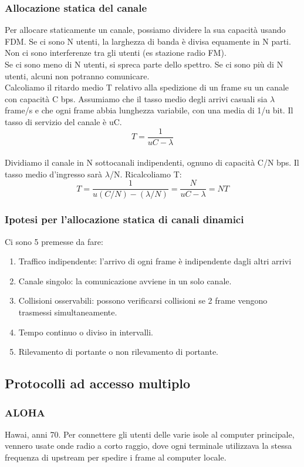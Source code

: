 \documentclass{article}
\begin{document}
\subsubsection{Allocazione statica del canale}
Per allocare staticamente un canale, possiamo dividere la sua capacità usando FDM. Se ci sono N utenti, la larghezza di banda è divisa equamente in N parti. Non ci sono interferenze tra gli utenti (es stazione radio FM). \\
Se ci sono meno di N utenti, si spreca parte dello spettro. Se ci sono più di N utenti, alcuni non potranno comunicare. \\
Calcoliamo il ritardo medio T relativo alla spedizione di un frame su un canale con capacità C bps. Assumiamo che il tasso medio degli arrivi casuali sia $\lambda$ frame/s e che ogni frame abbia lunghezza variabile, con una media di 1/u bit. Il tasso di servizio del canale è uC.
\begin{equation}
	T = \frac{1}{uC - \lambda}
\end{equation} 
\\
Dividiamo il canale in N sottocanali indipendenti, ognuno di capacità C/N bps. Il tasso medio d'ingresso sarà $\lambda$/N. Ricalcoliamo T:
\begin{equation}
	T = \frac{1}{u(C/N) - (\lambda /N)} = \frac{N}{uC - \lambda} = NT
\end{equation} 
\subsubsection{Ipotesi per l'allocazione statica di canali dinamici}
Ci sono 5 premesse da fare:
\begin{enumerate}
\item Traffico indipendente: l'arrivo di ogni frame è indipendente dagli altri arrivi
\item Canale singolo: la comunicazione avviene in un solo canale.
\item Collisioni osservabili: possono verificarsi collisioni se 2 frame vengono trasmessi simultaneamente.
\item Tempo continuo o diviso in intervalli.
\item Rilevamento di portante o non rilevamento di portante.
\end{enumerate}
\subsection{Protocolli ad accesso multiplo}
\subsubsection{ALOHA}
Hawai, anni 70. Per connettere gli utenti delle varie isole al computer principale, vennero usate onde radio a corto raggio, dove ogni terminale utilizzava la stessa frequenza di upstream per spedire i frame al computer locale. \\
\end{document}
